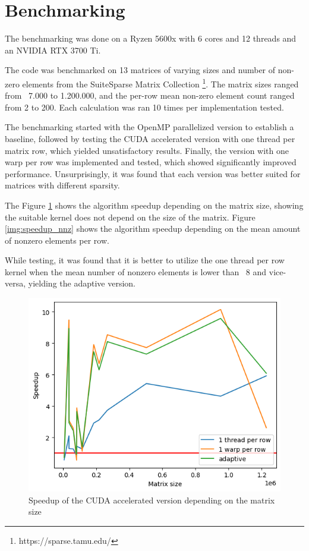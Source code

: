 \documentclass{article}
\begin{document}
\section{Benchmarking}
The benchmarking was done on a Ryzen 5600x with 6 cores and 12 threads and an NVIDIA RTX 3700 Ti.

The code was benchmarked on 13 matrices of varying sizes and number of non-zero elements
from the SuiteSparse Matrix Collection \footnote{https://sparse.tamu.edu/}.
The matrix sizes ranged from ~7.000 to 1.200.000,
and the per-row mean non-zero element count ranged from 2 to 200.
Each calculation was ran 10 times per implementation tested.

The benchmarking started with the OpenMP parallelized version to establish a baseline,
followed by testing the CUDA accelerated version with one thread per matrix row,
which yielded unsatisfactory results.
Finally, the version with one warp per row was implemented and tested,
which showed significantly improved performance.
Unsurprisingly, it was found that each version was better suited for matrices with different sparsity.

The Figure \ref{img:speedup_size} shows the algorithm speedup depending on the matrix size,
showing the suitable kernel does not depend on the size of the matrix.
Figure \ref{img:speedup_nnz} shows the algorithm speedup depending on the mean amount of nonzero elements per row.

While testing, it was found that it is better to utilize the one thread per row kernel
when the mean number of nonzero elements is lower than ~8 and vice-versa, yielding the adaptive version.

\begin{figure}[H]
\includegraphics[]{images/speedup_size.png}
\centering
\caption{Speedup of the CUDA accelerated version depending on the matrix size}
\label{img:speedup_size}
\end{figure}
\end{document}
